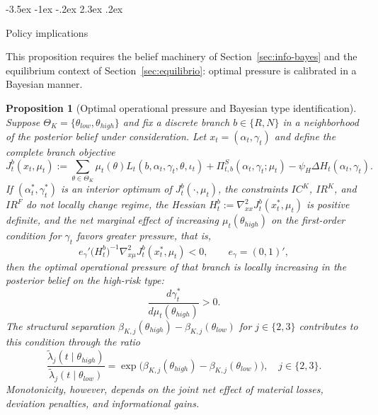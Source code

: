 \documentclass[12pt]{article}
\makeatletter
\numberwithin{equation}{section}
\numberwithin{table}{section}
\newtheorem{proposition}[theorem]{Proposition}
\theoremstyle{definition}
\renewcommand\section{\@startsection {section}{1}{\z@}%
                                   {-3.5ex \@plus -1ex \@minus -.2ex}%
                                   {2.3ex \@plus.2ex}%
                                   {\normalfont\Large\bfseries\raggedright}}
\makeatother
\begin{document}
\section{Policy implications}
\label{sec:politica}

\noindent This proposition requires the belief machinery of
Section~\ref{sec:info-bayes} and the equilibrium context of
Section~\ref{sec:equilibrio}: optimal pressure is calibrated in a Bayesian
manner.


\begin{proposition}[Optimal operational pressure and Bayesian type identification]
\label{prop:optimal-gamma-beliefs}
Suppose $\Theta_K=\{\theta_{low},\theta_{high}\}$ and fix a discrete branch
$b\in\{R,N\}$ in a neighborhood of the posterior belief under consideration. Let
$x_t=(\alpha_t,\gamma_t)$ and define the complete branch objective
\begin{equation}
\label{eq:obj-rama-completo}
J_t^b(x_t,\mu_t)
:=
\sum_{\theta\in\Theta_K}\mu_t(\theta)
L_t(b,\alpha_t,\gamma_t,\theta,\iota_t)
+\Pi_{t,b}^{S}(\alpha_t,\gamma_t;\mu_t)
-\psi_H\Delta H_t(\alpha_t,\gamma_t).
\end{equation}
If $(\alpha_t^\ast,\gamma_t^\ast)$ is an interior optimum of
$J_t^b(\cdot,\mu_t)$, the constraints $IC^K$, $IR^K$, and $IR^F$ do not locally
change regime, the Hessian
$H_t^b:=\nabla_{xx}^2J_t^b(x_t^\ast,\mu_t)$ is positive definite, and the net
marginal effect of increasing $\mu_t(\theta_{high})$ on the first-order
condition for $\gamma_t$ favors greater pressure, that is,
\begin{equation}
\label{eq:monotonia-neta-gamma}
e_\gamma'
\bigl(H_t^b\bigr)^{-1}
\nabla_{x\mu}^2J_t^b(x_t^\ast,\mu_t)
<0,
\qquad
e_\gamma=(0,1)',
\end{equation}
then the optimal operational pressure of that branch is locally increasing in
the posterior belief on the high-risk type:
\[
\frac{d\gamma_t^\ast}{d\mu_t(\theta_{high})}>0.
\]
The structural separation $\beta_{K,j}(\theta_{high})-\beta_{K,j}(\theta_{low})$
for $j\in\{2,3\}$ contributes to this condition through the ratio
\[
\frac{\tilde\lambda_j(t\mid\theta_{high})}{\tilde\lambda_j(t\mid\theta_{low})}
=\exp\!\bigl(\beta_{K,j}(\theta_{high})-\beta_{K,j}(\theta_{low})\bigr),
\quad j\in\{2,3\}.
\]
Monotonicity, however, depends on the joint net effect of material losses,
deviation penalties, and informational gains.
\end{proposition}
\end{document}
